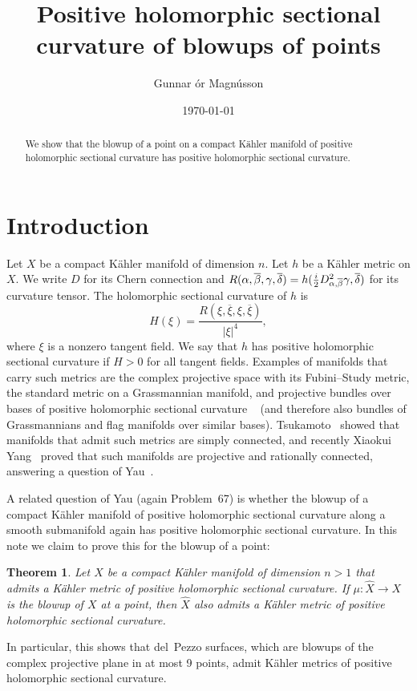 \documentclass[10pt,a4paper]{amsart}
\author{Gunnar \TH\'or Magn\'usson}
\date{\today}
\title[Positive holomorphic sectional curvature of blowups of points]
{Positive holomorphic sectional\\curvature of blowups of points}
\newtheorem*{maintheo}{Theorem}
\def\ov#1{\overline{#1}}
\def\hsc{holomorphic sectional curvature}
\def\bl#1{\widehat{#1}}
\def\blX{\bl{X}}
\begin{document}
\begin{abstract}
We show that the blowup of a point on a compact K\"ahler manifold of positive
holomorphic sectional curvature has positive holomorphic sectional curvature.
\end{abstract}

\maketitle


\section*{Introduction}

Let $X$ be a compact K\"ahler manifold of dimension $n$.
Let $h$ be a K\"ahler metric on $X$.
We write $D$ for its Chern connection and
$R(\alpha,\ov\beta,\gamma,\ov\delta) = h(\frac i2
D^2_{\smash{\alpha,\ov\beta}}\gamma, \ov\delta)$ for its curvature tensor. The
holomorphic sectional curvature of $h$ is
$$
H(\xi)
= \frac{R(\xi, \ov\xi, \xi, \ov\xi)}{|\xi|^4},
$$
where $\xi$ is a nonzero tangent field.
We say that $h$ has positive holomorphic sectional curvature if $H > 0$ for all
tangent fields.
Examples of manifolds that carry such metrics are the complex projective space
with its Fubini--Study metric, the standard metric on a Grassmannian manifold,
and projective bundles over bases of positive holomorphic sectional curvature
~\cite{alvarez2018projectivized}
(and therefore also bundles of Grassmannians and flag manifolds over similar
bases).
Tsukamoto~\cite{tsukamoto1957kahlerian} showed that manifolds that admit such
metrics are simply connected, and recently Xiaokui Yang~\cite{yang2017rc}
proved that such manifolds are projective and rationally connected, answering a
question of Yau~\cite[Problem~67]{yau1993open}.

A related question of Yau (again Problem~67) is whether the blowup of a compact
K\"ahler manifold of positive \hsc{} along a smooth submanifold again has
positive \hsc. In this note we claim to prove this for the blowup of a point:

\begin{maintheo}
Let $X$ be a compact K\"ahler manifold of dimension $n > 1$ that admits a
K\"ahler metric of positive \hsc.
If $\mu : \blX \to X$ is the blowup of $X$ at a point, then $\blX$ also admits
a K\"ahler metric of positive \hsc.
\end{maintheo}

In particular, this shows that del~Pezzo surfaces, which are blowups of the
complex projective plane in at most 9 points, admit K\"ahler metrics of
positive \hsc.
\end{document}
